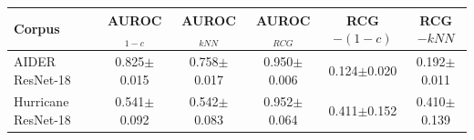 \begin{tabular}{lccccc}
\toprule
Corpus & AUROC$_{1-c}$ & AUROC$_{kNN}$ & AUROC$_{RCG}$ & RCG$-(1-c)$ & RCG$-kNN$ \\
\midrule
AIDER ResNet-18 & 0.825$\pm$0.015 & 0.758$\pm$0.017 & 0.950$\pm$0.006 & 0.124$\pm$0.020 & 0.192$\pm$0.011 \\
Hurricane ResNet-18 & 0.541$\pm$0.092 & 0.542$\pm$0.083 & 0.952$\pm$0.064 & 0.411$\pm$0.152 & 0.410$\pm$0.139 \\
\bottomrule
\end{tabular}
